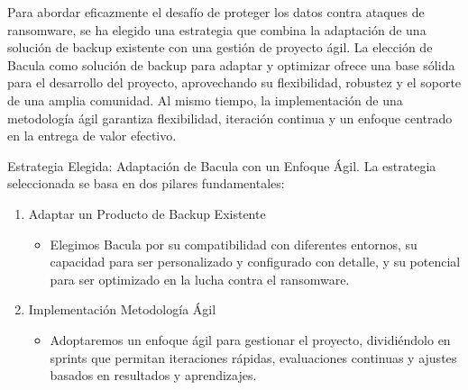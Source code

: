 Para abordar eficazmente el desafío de proteger los datos contra ataques de ransomware, se ha elegido una estrategia que combina la adaptación de una solución de backup existente con una gestión de proyecto ágil. La elección de Bacula como solución de backup para adaptar y optimizar ofrece una base sólida para el desarrollo del proyecto, aprovechando su flexibilidad, robustez y el soporte de una amplia comunidad. Al mismo tiempo, la implementación de una metodología ágil garantiza flexibilidad, iteración continua y un enfoque centrado en la entrega de valor efectivo.
\medskip

Estrategia Elegida: Adaptación de Bacula con un Enfoque Ágil.
La estrategia seleccionada se basa en dos pilares fundamentales:
\begin{enumerate}
    \item Adaptar un Producto de Backup Existente
        \begin{itemize}
        \item Elegimos Bacula por su compatibilidad con diferentes entornos, su capacidad para ser personalizado y configurado con detalle, y su potencial para ser optimizado en la lucha contra el ransomware.
        \end{itemize}

    \item Implementación Metodología Ágil
    \begin{itemize}
        \item Adoptaremos un enfoque ágil para gestionar el proyecto, dividiéndolo en sprints que permitan iteraciones rápidas, evaluaciones continuas y ajustes basados en resultados y aprendizajes.
        \end{itemize}
\end{enumerate}

\newpage